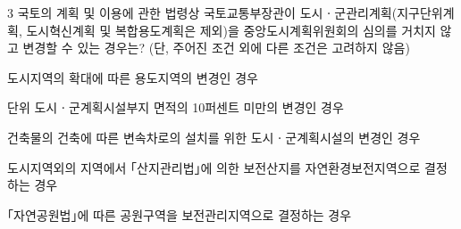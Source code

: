 \begin{question}{3}
국토의 계획 및 이용에 관한 법령상 국토교통부장관이 도시ㆍ군관리계획(지구단위계획, 도시혁신계획 및 복합용도계획은 제외)을 중앙도시계획위원회의 심의를 거치지 않고 변경할 수 있는 경우는? (단, 주어진 조건 외에 다른 조건은 고려하지 않음)
\begin{choices}
  \item 도시지역의 확대에 따른 용도지역의 변경인 경우
  \item 단위 도시ㆍ군계획시설부지 면적의 10퍼센트 미만의 변경인 경우
  \item 건축물의 건축에 따른 변속차로의 설치를 위한 도시ㆍ군계획시설의 변경인 경우
  \item 도시지역외의 지역에서 ｢산지관리법｣에 의한 보전산지를 자연환경보전지역으로 결정하는 경우
  \item ｢자연공원법｣에 따른 공원구역을 보전관리지역으로 결정하는 경우
\end{choices}
\end{question}
